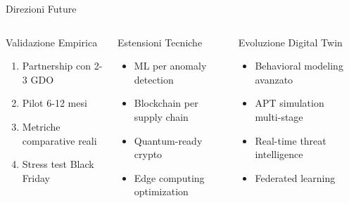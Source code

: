 \documentclass[aspectratio=169,10pt]{beamer}
\begin{document}
\begin{frame}{Direzioni Future}
\begin{columns}[T]
\begin{block}{Validazione Empirica}
\begin{enumerate}
    \item Partnership con 2-3 GDO
    \item Pilot 6-12 mesi
    \item Metriche comparative reali
    \item Stress test Black Friday
\end{enumerate}
\end{block}

\begin{block}{Estensioni Tecniche}
\begin{itemize}
    \item ML per anomaly detection
    \item Blockchain per supply chain
    \item Quantum-ready crypto
    \item Edge computing optimization
\end{itemize}
\end{block}

\begin{block}{Evoluzione Digital Twin}
\begin{itemize}
    \item Behavioral modeling avanzato
    \item APT simulation multi-stage
    \item Real-time threat intelligence
    \item Federated learning
\end{itemize}
\end{block}

\begin{center}
\end{center}
\end{columns}
\end{frame}
\end{document}
